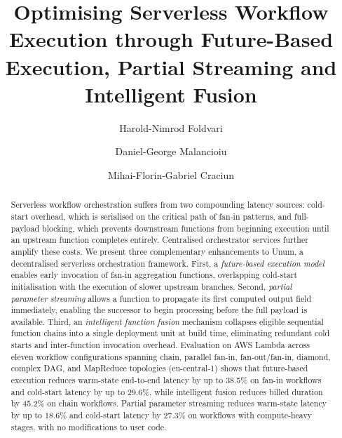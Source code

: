 \documentclass[runningheads]{llncs}
\begin{document}
%
\title{Optimising Serverless Workflow Execution through Future-Based Execution, Partial Streaming and Intelligent Fusion}
%
%
\author{Harold-Nimrod Foldvari \and
Daniel-George Malancioiu \and
Mihai-Florin-Gabriel Craciun}
%
%
%
\maketitle              %
%
\begin{abstract}
Serverless workflow orchestration suffers from two compounding latency sources: cold-start overhead, which is serialised on the critical path of fan-in patterns, and full-payload blocking, which prevents downstream functions from beginning execution until an upstream function completes entirely. Centralised orchestrator services further amplify these costs. We present three complementary enhancements to Unum, a decentralised serverless orchestration framework. First, a \emph{future-based execution model} enables early invocation of fan-in aggregation functions, overlapping cold-start initialisation with the execution of slower upstream branches. Second, \emph{partial parameter streaming} allows a function to propagate its first computed output field immediately, enabling the successor to begin processing before the full payload is available. Third, an \emph{intelligent function fusion} mechanism collapses eligible sequential function chains into a single deployment unit at build time, eliminating redundant cold starts and inter-function invocation overhead. Evaluation on AWS Lambda across eleven workflow configurations spanning chain, parallel fan-in, fan-out/fan-in, diamond, complex DAG, and MapReduce topologies (eu-central-1) shows that future-based execution reduces warm-state end-to-end latency by up to 38.5\% on fan-in workflows and cold-start latency by up to 29.6\%, while intelligent fusion reduces billed duration by 45.2\% on chain workflows. Partial parameter streaming reduces warm-state latency by up to 18.6\% and cold-start latency by 27.3\% on workflows with compute-heavy stages, with no modifications to user code.

\end{abstract}
\end{document}
